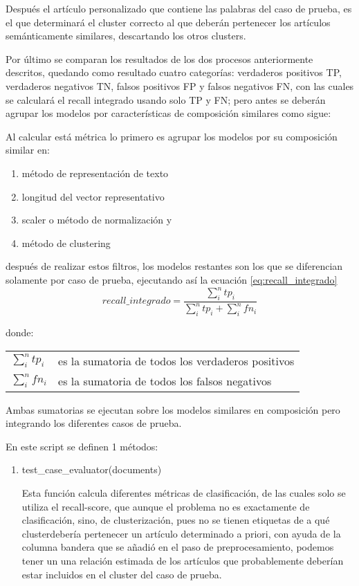 \documentclass[12pt]{article}
\makeatletter
\newenvironment{conditions}
{\par\vspace{\abovedisplayskip}\noindent\begin{tabular}{>{$}l<{$} @{${}={}$} l}}
	{\end{tabular}\par\vspace{\belowdisplayskip}}
\makeatother
\begin{document}
				Después el artículo personalizado que contiene las palabras del caso de prueba, es el que determinará el cluster correcto al que deberán pertenecer los artículos semánticamente similares, descartando los otros clusters.
				
				Por último se comparan los resultados de los dos procesos anteriormente descritos, quedando como resultado cuatro categorías: verdaderos positivos TP, verdaderos negativos TN, falsos positivos FP y falsos negativos FN,  con las cuales se calculará el recall integrado usando solo TP y FN; pero antes se deberán agrupar los modelos por características de composición similares como sigue:
				
				Al calcular está métrica lo primero es agrupar los modelos por su composición similar en:
				\begin{enumerate}
					\item método de representación de texto
					
					\item longitud del vector representativo
					
					\item scaler o método de normalización y
					
					\item método de clustering 
				\end{enumerate}
				después de realizar estos filtros, los modelos restantes son los que se diferencian solamente por caso de prueba, ejecutando así la ecuación \ref{eq:recall_integrado}
					\begin{equation}\label{eq:recall_integrado}
						recall\_integrado = \frac{\sum_i^n tp_i}{\sum_i^n tp_i + \sum_i^n fn_i}
					\end{equation}
	
					donde:
					\begin{conditions}
						\sum_i^n tp_i &  es la sumatoria de todos los verdaderos positivos\\
						\sum_i^n fn_i &  es la sumatoria de todos los falsos negativos 
					\end{conditions}
					Ambas sumatorias se ejecutan sobre los modelos similares en composición pero integrando los diferentes casos de prueba.					
				
				En este script se definen 1 métodos:
				\begin{enumerate}
				
					\item test\_case\_evaluator(documents)
			
				 Esta función calcula diferentes métricas de clasificación, de las cuales solo se utiliza el recall-score, que aunque el problema no es exactamente de clasificación, sino, de clusterización, pues no se tienen etiquetas de a qué clusterdebería pertenecer un artículo determinado a priori, con ayuda de la columna bandera que se añadió en el paso de preprocesamiento, podemos tener un una relación estimada de los artículos que probablemente deberían estar incluidos en el cluster del caso de prueba.
				
				\end{enumerate}
				
\end{document}
